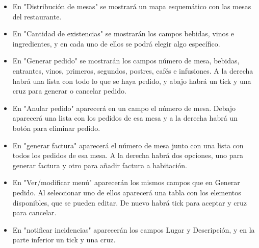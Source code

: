 \documentclass[spanish,a4paper,12pt]{report}	%
\begin{document}
\begin{itemize}
\begin{itemize}
\begin{itemize}
						\item En "Distribución de mesas" se mostrará un mapa esquemático con las mesas del restaurante. 
						\item En "Cantidad de existencias" se mostrarán los campos bebidas, vinos e ingredientes, y en cada uno de ellos se podrá elegir algo específico. 
						\item En "Generar pedido" se mostrarán los campos número de mesa, bebidas, entrantes, vinos, primeros, segundos, postres, cafés e infusiones. A la derecha habrá una lista con todo lo que se haya pedido, y abajo habrá un tick y una cruz para generar o cancelar pedido. 
						\item En "Anular pedido" aparecerá en un campo el número de mesa. Debajo aparecerá una lista con los pedidos de esa mesa y a la derecha habrá un botón para eliminar pedido. 
						\item En "generar factura" aparecerá el número de mesa junto con una lista con todos los pedidos de esa mesa. A la derecha habrá dos opciones, uno para generar factura y otro para añadir factura a habitación.
						\item En "Ver/modificar menú" aparecerán los mismos campos que en Generar pedido. Al seleccionar uno de ellos aparecerá una tabla con los elementos disponibles, que se pueden editar. De nuevo habrá tick para aceptar y cruz para cancelar. 
						\item En "notificar incidencias" aparecerán los campos Lugar y Descripción, y en la parte inferior un tick y una cruz. 
					\end{itemize}
					

\end{itemize}
\end{itemize}
\end{document}
